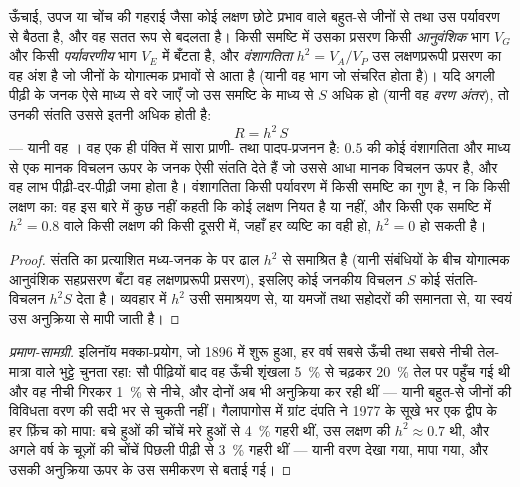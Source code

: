 \begin{theorem}[वंशागतिता और वरण की अनुक्रिया]\label{thm:b2:population-genetics:heritability}
ऊँचाई, उपज या चोंच की गहराई जैसा कोई लक्षण छोटे प्रभाव वाले बहुत-से
जीनों से तथा उस पर्यावरण से बैठता है, और वह
सतत रूप से बदलता है। किसी समष्टि में उसका प्रसरण किसी
\emph{आनुवंशिक} भाग $V_G$ और किसी \emph{पर्यावरणीय} भाग $V_E$ में बँटता है, और
\emph{वंशागतिता} $h^{2} = V_A/V_P$ उस लक्षणप्ररूपी प्रसरण का वह अंश है जो
जीनों के योगात्मक प्रभावों से आता है (यानी वह भाग
जो संचरित होता है)। यदि अगली पीढ़ी के जनक ऐसे माध्य से वरे जाएँ जो उस
समष्टि के माध्य से $S$ अधिक हो (यानी वह
\emph{वरण अंतर}), तो उनकी संतति उससे इतनी अधिक होती है:
\[
R = h^{2}\,S
\]
--- यानी वह \emph{}। वह एक ही पंक्ति में सारा प्राणी- तथा
पादप-प्रजनन है: $0.5$ की कोई वंशागतिता और माध्य से एक
मानक विचलन ऊपर के जनक ऐसी संतति देते हैं जो उससे आधा मानक विचलन
ऊपर है, और वह लाभ पीढ़ी-दर-पीढ़ी जमा होता है।
वंशागतिता किसी पर्यावरण में किसी समष्टि का गुण है, न कि किसी
लक्षण का: वह इस बारे में कुछ नहीं कहती कि कोई लक्षण नियत है या नहीं,
और किसी एक समष्टि में $h^{2} = 0.8$ वाले किसी लक्षण की किसी दूसरी में, जहाँ हर व्यष्टि का वही
 हो, $h^{2} = 0$ हो सकती है।
\end{theorem}
\begin{proof}
संतति का प्रत्याशित  मध्य-जनक के  पर
ढाल $h^{2}$ से समाश्रित है (यानी संबंधियों के बीच योगात्मक आनुवंशिक सहप्रसरण
बँटा वह लक्षणप्ररूपी प्रसरण), इसलिए कोई जनकीय विचलन $S$
कोई संतति-विचलन $h^{2}S$ देता है। व्यवहार में $h^{2}$
उसी समाश्रयण से, या यमजों तथा सहोदरों की समानता से, या
स्वयं उस अनुक्रिया से मापी जाती है।
\end{proof}
\begin{proof}[प्रमाण-सामग्री]
इलिनॉय मक्का-प्रयोग, जो 1896 में शुरू हुआ, हर वर्ष सबसे ऊँची तथा सबसे नीची
तेल-मात्रा वाले भुट्टे चुनता रहा: सौ पीढ़ियों बाद
वह ऊँची शृंखला \qty{5}{\%} से चढ़कर \qty{20}{\%}
तेल पर पहुँच गई थी और वह नीची गिरकर \qty{1}{\%} से नीचे, और दोनों अब भी
अनुक्रिया कर रही थीं --- यानी बहुत-से जीनों की विविधता वरण की
सदी भर से चुकती नहीं। गैलापागोस में ग्रांट दंपति ने 1977 के सूखे भर
एक द्वीप के हर फ़िंच को मापा: बचे हुओं की
चोंचें मरे हुओं से \qty{4}{\%} गहरी थीं, उस लक्षण की $h^{2}
\approx 0.7$ थी, और अगले वर्ष के चूज़ों की चोंचें पिछली पीढ़ी से
\qty{3}{\%} गहरी थीं --- यानी वरण
देखा गया, मापा गया, और उसकी अनुक्रिया ऊपर के उस समीकरण से
बताई गई।
\end{proof}

